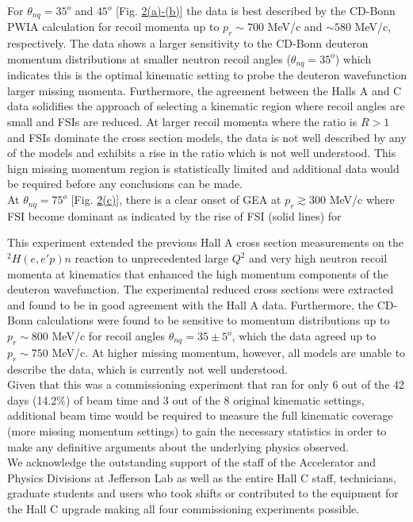 \indent For $\theta_{nq}=35^{o}$ and $45^{o}$ [Fig. \hyperref[fig:fig2]{2(a)-(b)}] the data is best described by the CD-Bonn PWIA calculation for recoil momenta up to $p_{r}\sim700$ MeV/c and $\sim580$ MeV/c, respectively.
The data shows a larger sensitivity to the CD-Bonn deuteron momentum distributions at smaller neutron recoil angles ($\theta_{nq}=35^{o}$) which indicates this is the optimal kinematic setting to probe the deuteron
wavefunction larger missing momenta. Furthermore, the agreement between the Halls A and C data solidifies the approach of selecting a kinematic region where recoil angles are small and FSIs are reduced.
At larger recoil momenta where the ratio is $R>1$ and FSIs dominate the cross section models, the data is not well described by any of the models and exhibits a rise in the ratio which is not well understood.
This hign missing momentum region is statistically limited and additional data would be required before any conclusions can be made. \\
\indent At $\theta_{nq}=75^{o}$ [Fig. \hyperref[fig:fig2]{2(c)}], there is a clear onset of GEA at $p_{r}\gtrsim300$ MeV/c where FSI become dominant as indicated by the rise of FSI (solid lines) for



\indent This experiment extended the previous Hall A cross section measurements on the $^{2}H(e,e'p)n$ reaction to 
unprecedented large $Q^{2}$ and very high neutron recoil momenta at kinematics that enhanced the high momentum components of the deuteron wavefunction.
The experimental reduced cross sections were extracted and found to be in good agreement with the Hall A data. Furthermore, the CD-Bonn calculations
were found to be sensitive to momentum distributions up to $p_{r}\sim800$ MeV/c for recoil angles $\theta_{nq}=35\pm5^{o}$, which the data agreed
up to $p_{r}\sim750$ MeV/c. At higher missing momentum, however, all models are unable to describe the data, which is currently not well understood.\\
\indent Given that this was a commissioning experiment that ran for only 6 out of the 42 days (14.2$\%$) of beam time and 3 out of the 8 original kinematic settings,
additional beam time would be required to measure the full kinematic coverage (more missing momentum settings) to gain the necessary statistics 
in order to make any definitive arguments about the underlying physics observed. \\
\indent We acknowledge the outstanding support of the staff of the Accelerator and Physics Divisions at Jefferson Lab
as well as the entire Hall C staff, technicians, graduate students and users who took shifts or contributed
to the equipment for the Hall C upgrade making all four commissioning experiments possible. 

